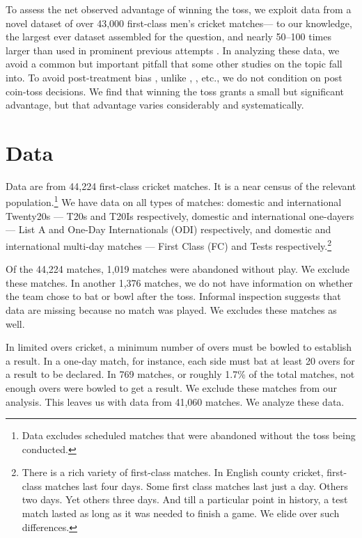\documentclass[12pt]{article}
\begin{document}
To assess the net observed advantage of winning the toss, we exploit data from a novel dataset of over 43,000 first-class men's cricket matches--- to our knowledge, the largest ever dataset assembled for the question, and nearly 50--100 times larger than used in prominent previous attempts \citep[see,][]{dawson2009bat, de1998winning}. In analyzing these data, we avoid a common but important pitfall that some other studies on the topic fall into. To avoid post-treatment bias \citep[see][]{acharya2015}, unlike \citet{dawson2009bat}, \citet{Saad2015}, etc., we do not condition on post coin-toss decisions. We find that winning the toss grants a small but significant advantage, but that advantage varies considerably and systematically.

\section*{Data}
Data are from 44,224 first-class cricket matches. It is a near census of the relevant population.\footnote{Data excludes scheduled matches that were abandoned without the toss being conducted.} We have data on all types of matches: domestic and international Twenty20s --- T20s and T20Is respectively, domestic and international one-dayers --- List A and One-Day Internationals (ODI) respectively, and domestic and international multi-day matches --- First Class (FC) and Tests respectively.\footnote{There is a rich variety of first-class matches. In English county cricket, first-class matches last four days. Some first class matches last just a day. Others two days. Yet others three days. And till a particular point in history, a test match lasted as long as it was needed to finish a game. We elide over such differences.} 

Of the 44,224 matches, 1,019 matches were abandoned without play. We exclude these matches. In another 1,376 matches, we do not have information on whether the team chose to bat or bowl after the toss. Informal inspection suggests that data are missing because no match was played. We excludes these matches as well. 

In limited overs cricket, a minimum number of overs must be bowled to establish a result. In a one-day match, for instance, each side must bat at least 20 overs for a result to be declared. In 769 matches, or roughly 1.7\% of the total matches, not enough overs were bowled to get a result. We exclude these matches from our analysis. This leaves us with data from 41,060 matches. We analyze these data.
 
\end{document}
